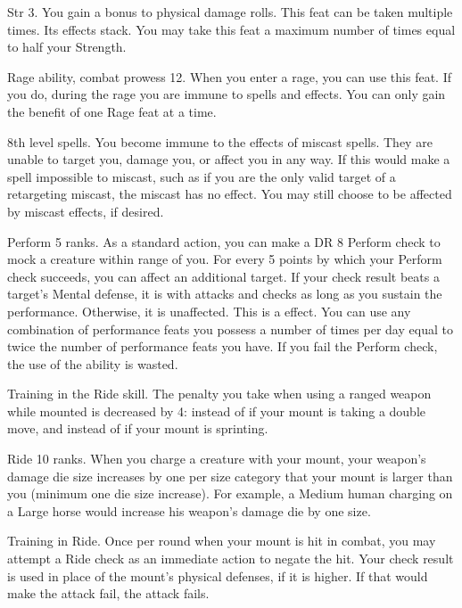 \featpres Str 3.
\featben You gain a  bonus to physical damage rolls.
 This feat can be taken multiple times. Its effects stack.
You may take this feat a maximum number of times equal to half your Strength.

\featpres Rage ability, combat prowess 12.
\featben When you enter a rage, you can use this feat. If you do, during the rage you are immune to  spells and effects.
 You can only gain the benefit of one Rage feat at a time.

\featpre 8th level spells.
\featben You become immune to the effects of miscast spells.
They are unable to target you, damage you, or affect you in any way.
If this would make a spell impossible to miscast, such as if you are the only valid target of a retargeting miscast, the miscast has no effect.
You may still choose to be affected by miscast effects, if desired.

\featpre Perform 5 ranks.
\featben As a standard action, you can make a DR 8 Perform check to mock a creature within \rngmed range of you.
For every 5 points by which your Perform check succeeds, you can affect an additional target.
If your check result beats a target's Mental defense, it is \impaired with attacks and checks as long as you sustain the performance.
Otherwise, it is unaffected.
This is a  effect.
You can use any combination of performance feats you possess a number of times per day equal to twice the number of performance feats you have.
If you fail the Perform check, the use of the ability is wasted.

\featpre Training in the Ride skill.
\featben The penalty you take when using a ranged weapon while mounted is decreased by 4:  instead of  if your mount is taking a double move, and  instead of  if your mount is sprinting.

\featpre Ride 10 ranks.
\featben When you charge a creature with your mount, your weapon's damage die size increases by one per size category that your mount is larger than you (minimum one die size increase).
For example, a Medium human charging on a Large horse would increase his weapon's damage die by one size.

\featpre Training in Ride.
\featben Once per round when your mount is hit in combat, you may attempt a Ride check as an immediate action to negate the hit.
Your check result is used in place of the mount's physical defenses, if it is higher.
If that would make the attack fail, the attack fails.

